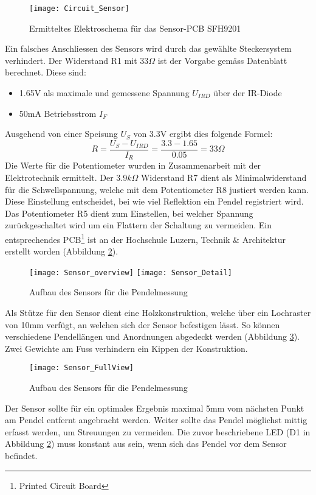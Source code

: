 	\begin{figure}[H]
		\centering
		\texttt{[image: Circuit\_Sensor]}
		\caption{Ermitteltes Elektroschema für das Sensor-PCB SFH9201}
		\label{fig:schema_sensor}
	\end{figure}
	\noindent Ein falsches Anschliessen des Sensors wird durch das gewählte Steckersystem verhindert. Der Widerstand R1 mit 33$\Omega$ ist der Vorgabe gemäss Datenblatt berechnet. Diese sind:
	\begin{itemize}
		\item 1.65V als maximale und gemessene Spannung $U_{IRD}$ über der IR-Diode
		\item 50mA Betriebsstrom $I_F$
	\end{itemize}
	Ausgehend von einer Speisung $U_S$ von 3.3V ergibt dies folgende Formel:
	\[
		R = \frac{U_S - U_{IRD}}{I_R} = \frac{3.3 - 1.65}{0.05} = 33\Omega
	\]
	Die Werte für die Potentiometer wurden in Zusammenarbeit mit der Elektrotechnik ermittelt. Der 3.9$k\Omega$ Widerstand R7 dient als Minimalwiderstand für die Schwellspannung, welche mit dem Potentiometer R8 justiert werden kann. Diese Einstellung entscheidet, bei wie viel Reflektion ein Pendel registriert wird.
Das Potentiometer R5 dient zum Einstellen, bei welcher Spannung zurückgeschaltet wird um ein Flattern der Schaltung zu vermeiden.
Ein entsprechendes PCB\footnote{Printed Circuit Board} ist an der Hochschule Luzern, Technik \& Architektur erstellt worden (Abbildung \ref{fig:Sensor_overview}).\\
	\begin{figure}[H]
		\centering
		\texttt{[image: Sensor\_overview]}
		\texttt{[image: Sensor\_Detail]}
		\caption{Aufbau des Sensors für die Pendelmessung}
		\label{fig:Sensor_overview}
	\end{figure}
	\noindent Als Stütze für den Sensor dient eine Holzkonstruktion, welche über ein Lochraster von 10mm verfügt, an welchen sich der Sensor befestigen lässt. So können verschiedene Pendellängen und Anordnungen abgedeckt werden (Abbildung \ref{fig:Sensor_FullView}). Zwei Gewichte am Fuss verhindern ein Kippen der Konstruktion.
	\begin{figure}[H]
		\centering
		\texttt{[image: Sensor\_FullView]}
		\caption{Aufbau des Sensors für die Pendelmessung}
		\label{fig:Sensor_FullView}
	\end{figure}
	\noindent Der Sensor sollte für ein optimales Ergebnis maximal 5mm vom nächsten Punkt am Pendel entfernt angebracht werden. Weiter sollte das Pendel möglichst mittig erfasst werden, um Streuungen zu vermeiden. Die zuvor beschriebene LED (D1 in Abbildung \ref{fig:Sensor_overview}) muss konstant aus sein, wenn sich das Pendel vor dem Sensor befindet. 
